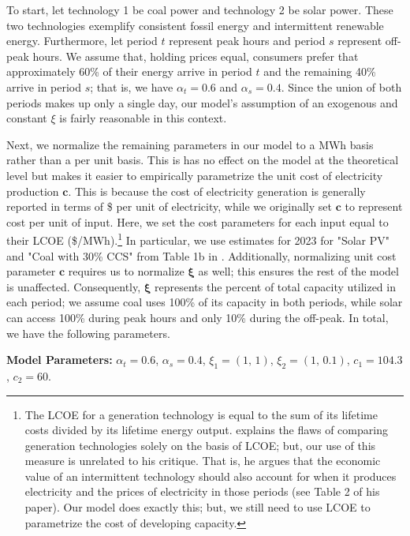 \documentclass[11pt,a4paper,leqno]{extarticle}
\begin{document}
	To start, let technology 1 be coal power and technology 2 be solar power. These two technologies exemplify consistent fossil energy and intermittent renewable energy.  Furthermore,  let period $t$ represent peak hours and period $s$ represent off-peak hours. We assume that, holding prices equal, consumers prefer that approximately 60\% of their energy arrive in period $t$ and the remaining 40\% arrive in period $s$; that is, we have $\alpha_t = 0.6$ and $\alpha_s = 0.4$. Since the union of both periods makes up only a single day, our model's assumption of an exogenous and constant $\xi$ is fairly reasonable in this context. 
	
	Next, we normalize the remaining parameters in our model to a MWh basis rather than a per unit basis. This is has no effect on the model at the theoretical level but makes it easier to empirically parametrize the unit cost of electricity production $\mathbf{c}$. This is because the cost of electricity generation is generally reported in terms of \$ per unit of electricity, while we originally set $\mathbf{c}$ to represent cost per unit of input. Here, we set the cost parameters for each input equal to their LCOE (\$/MWh).\footnote{ The LCOE for a generation technology is equal to the sum of its lifetime costs divided by its lifetime energy output. \citet{Joskow2011} explains the flaws of comparing generation technologies solely on the basis of LCOE; but,  our use of this measure is unrelated to his critique. That is, he argues that the economic value of an intermittent technology should also account for when it produces electricity and the prices of electricity in those periods (see Table 2 of his paper). Our model does exactly this; but, we still need to  use LCOE to parametrize the cost of developing capacity. 
	} In particular, we use estimates for 2023 for "Solar PV" and "Coal with 30\% CCS" from Table 1b in  \citet{EIALCOE}. Additionally, normalizing unit cost parameter $\mathbf{c}$ requires us to normalize $\boldsymbol{\xi}$ as well; this ensures the rest of the model is unaffected. Consequently, $\boldsymbol{\xi}$  represents the percent of total capacity utilized in each period; we assume coal uses 100\% of its capacity in both periods, while solar can access 100\% during peak hours and only 10\% during the off-peak. In total, we have the following parameters. 
	
	\begin{center}
		\noindent \textbf{Model Parameters:} $\alpha_t = 0.6$, $\alpha_s = 0.4$, $\xi_1 = (1, \, 1)$, $\xi_2 = (1, \, 0.1)$, $c_1 = 104.3$, $c_2 = 60$. 
		\label{Params: Example A}
	\end{center}
	
\end{document}
